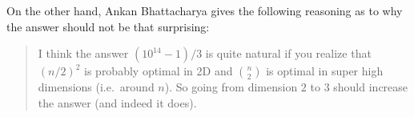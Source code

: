 \documentclass[11pt]{scrartcl}
\begin{document}
\begin{remark*}
  On the other hand, Ankan Bhattacharya gives the following
  reasoning as to why the answer should not be that surprising:
  \begin{quote}
    I think the answer $(10^{14} - 1)/3$ is quite natural
    if you realize that $(n/2)^2$ is probably optimal in 2D and
    $\binom n2$ is optimal in super high dimensions (i.e.\ around $n$).
    So going from dimension $2$ to $3$ should increase the answer
    (and indeed it does).
  \end{quote}
\end{remark*}
\pagebreak
\end{document}
